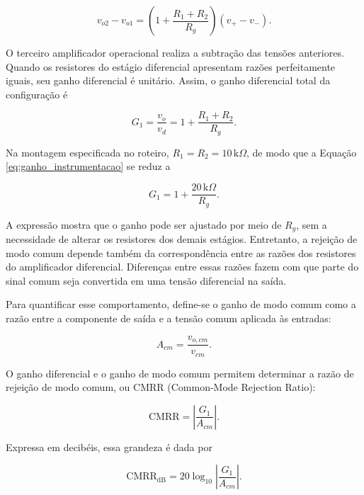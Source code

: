 \documentclass[11pt,a4paper]{article}
\begin{document}
\begin{equation}
v_{o2}-v_{o1}
=
\left(1+\frac{R_1+R_2}{R_g}\right)
(v_+-v_-).
\label{eq:ganho_primeiro_estagio}
\end{equation}

O terceiro amplificador operacional realiza a subtração das tensões anteriores. Quando os resistores do estágio diferencial apresentam razões perfeitamente iguais, seu ganho diferencial é unitário. Assim, o ganho diferencial total da configuração é

\begin{equation}
G_1=\frac{v_o}{v_d}
=
1+\frac{R_1+R_2}{R_g}.
\label{eq:ganho_instrumentacao}
\end{equation}

Na montagem especificada no roteiro, $R_1=R_2=10\,\mathrm{k}\Omega$, de modo que a Equação \ref{eq:ganho_instrumentacao} se reduz a

\begin{equation}
G_1=1+\frac{20\,\mathrm{k}\Omega}{R_g}.
\label{eq:ganho_tres_opamps}
\end{equation}

A expressão mostra que o ganho pode ser ajustado por meio de $R_g$, sem a necessidade de alterar os resistores dos demais estágios. Entretanto, a rejeição de modo comum depende também da correspondência entre as razões dos resistores do amplificador diferencial. Diferenças entre essas razões fazem com que parte do sinal comum seja convertida em uma tensão diferencial na saída.

Para quantificar esse comportamento, define-se o ganho de modo comum como a razão entre a componente de saída e a tensão comum aplicada às entradas:

\begin{equation}
A_{cm}=\frac{v_{o,cm}}{v_{cm}}.
\label{eq:ganho_modo_comum}
\end{equation}

O ganho diferencial e o ganho de modo comum permitem determinar a razão de rejeição de modo comum, ou CMRR (Common-Mode Rejection Ratio):

\begin{equation}
\mathrm{CMRR}
=
\left|\frac{G_1}{A_{cm}}\right|.
\label{eq:cmrr}
\end{equation}

Expressa em decibéis, essa grandeza é dada por

\begin{equation}
\mathrm{CMRR}_{\mathrm{dB}}
=
20\log_{10}\left|\frac{G_1}{A_{cm}}\right|.
\label{eq:cmrr_db}
\end{equation}
\end{document}
